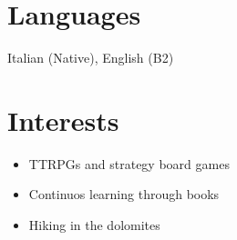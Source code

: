 \documentclass[a4paper,10pt]{article}
\begin{document}
\begin{minipage}[t]{0.33\textwidth}
    \section*{Languages}
        Italian (Native), English (B2)

    \section*{Interests}
        \begin{itemize}[left=0.2cm, label={\textbullet}]
            \item TTRPGs and strategy board games
            \item Continuos learning through books
            \item Hiking in the dolomites
        \end{itemize}

\end{minipage}
\hfill
\end{document}
